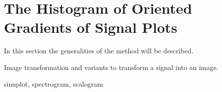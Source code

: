 \chapter{The Histogram of Oriented Gradients of Signal Plots}

In this section the generalities of the method will be described.

Image transformation and variants to transform a signal into an image.

sinuplot, spectrogram, scalogram

